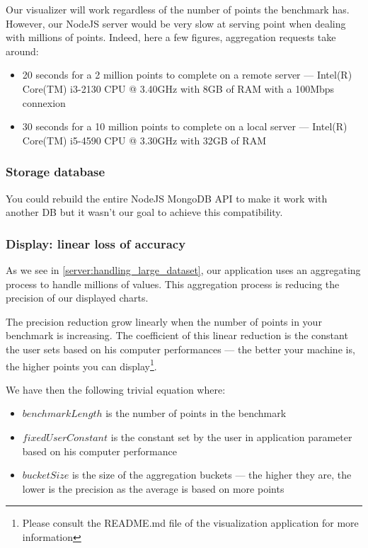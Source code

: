 \documentclass[a4paper,11pt]{report}
\begin{document}
Our visualizer will work regardless of the number of points the benchmark has. However, our NodeJS server would be very slow at serving point when dealing with millions of points. Indeed, here a few figures, aggregation requests take around:
\begin{itemize}
\item
20 seconds for a 2 million points to complete on a remote server --- Intel(R) Core(TM) i3-2130 CPU @ 3.40GHz with 8GB of RAM with a 100Mbps connexion
\item
30 seconds for a 10 million points to complete on a local server --- Intel(R) Core(TM) i5-4590 CPU @ 3.30GHz with 32GB of RAM
\end{itemize}

\subsubsection{Storage database}

You could rebuild the entire NodeJS MongoDB API to make it work with another DB but it wasn't our goal to achieve this compatibility.

\subsubsection{Display: linear loss of accuracy}

As we see in \ref{server:handling_large_dataset}, our application uses an aggregating process to handle millions of values. This aggregation process is reducing the precision of our displayed charts.

The precision reduction grow linearly when the number of points in your benchmark is increasing. The coefficient of this linear reduction is the constant the user sets based on his computer performances --- the better your machine is, the higher points you can display\footnote{Please consult the README.md file of the visualization application for more information}. 

We have then the following trivial equation where: 
\begin{itemize}
\item
$benchmarkLength$ is the number of points in the benchmark
\item
$fixedUserConstant$ is the constant set by the user in application parameter based on his computer performance
\item
$bucketSize$ is the size of the aggregation buckets --- the higher they are, the lower is the precision as the average is based on more points
\end{itemize}
\end{document}
